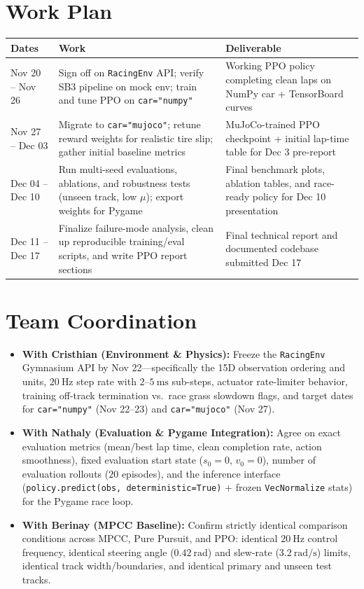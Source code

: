 \documentclass[11pt]{article}
\begin{document}
\section{Work Plan}
\begin{center}
\begin{tabular}{l p{} p{}}
\toprule
Dates & Work & Deliverable\\
\midrule
Nov 20 -- Nov 26 & Sign off on \texttt{RacingEnv} API; verify SB3 pipeline on mock env; train and tune PPO on \texttt{car="numpy"} & Working PPO policy completing clean laps on NumPy car + TensorBoard curves\\
Nov 27 -- Dec 03 & Migrate to \texttt{car="mujoco"}; retune reward weights for realistic tire slip; gather initial baseline metrics & MuJoCo-trained PPO checkpoint + initial lap-time table for Dec 3 pre-report\\
Dec 04 -- Dec 10 & Run multi-seed evaluations, ablations, and robustness tests (unseen track, low $\mu$); export weights for Pygame & Final benchmark plots, ablation tables, and race-ready policy for Dec 10 presentation\\
Dec 11 -- Dec 17 & Finalize failure-mode analysis, clean up reproducible training/eval scripts, and write PPO report sections & Final technical report and documented codebase submitted Dec 17\\
\bottomrule
\end{tabular}
\end{center}

\section{Team Coordination}
\begin{itemize}[leftmargin=1.5em, itemsep=0.25em]
    \item \textbf{With Cristhian (Environment \& Physics):} Freeze the \texttt{RacingEnv} Gymnasium API by Nov 22---specifically the 15D observation ordering and units, $20~\text{Hz}$ step rate with $2\text{--}5~\text{ms}$ sub-steps, actuator rate-limiter behavior, training off-track termination vs.\ race grass slowdown flags, and target dates for \texttt{car="numpy"} (Nov 22--23) and \texttt{car="mujoco"} (Nov 27).
    \item \textbf{With Nathaly (Evaluation \& Pygame Integration):} Agree on exact evaluation metrics (mean/best lap time, clean completion rate, action smoothness), fixed evaluation start state ($s_0 = 0$, $v_0 = 0$), number of evaluation rollouts ($20$ episodes), and the inference interface (\texttt{policy.predict(obs, deterministic=True)} + frozen \texttt{VecNormalize} stats) for the Pygame race loop.
    \item \textbf{With Berinay (MPCC Baseline):} Confirm strictly identical comparison conditions across MPCC, Pure Pursuit, and PPO: identical $20~\text{Hz}$ control frequency, identical steering angle ($0.42~\text{rad}$) and slew-rate ($3.2~\text{rad/s}$) limits, identical track width/boundaries, and identical primary and unseen test tracks.
\end{itemize}
\end{document}
